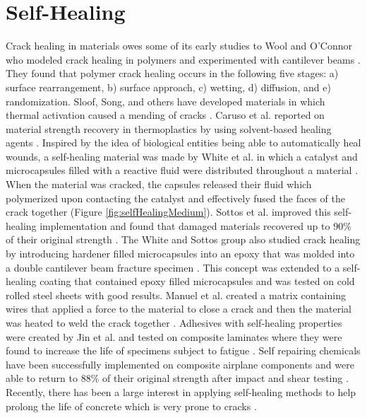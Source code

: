 \section{Self-Healing}

Crack healing in materials owes some of its early studies to Wool and O'Connor who modeled crack healing in polymers and experimented with cantilever beams \cite{Wool1981, Wool1982}. They found that polymer crack healing occurs in the following five stages: a) surface rearrangement, b) surface approach, c) wetting, d) diffusion, and e) randomization. Sloof, Song, and others have developed materials in which thermal activation caused a mending of cracks \cite{Song2009, Sloof2009, Bosman2009, Djugum2009, Luo2009}. Caruso et al. reported on material strength recovery in thermoplastics by using solvent-based healing agents \cite{Caruso2009}. Inspired by the idea of biological entities being able to automatically heal wounds, a self-healing material was made by White et al. in which a catalyst and microcapsules filled with a reactive fluid were distributed throughout a material \cite{White2001}. When the material was cracked, the capsules released their fluid which polymerized upon contacting the catalyst and effectively fused the faces of the crack together (Figure \ref{fig:selfHealingMedium}). Sottos et al. improved this self-healing implementation and found that damaged materials recovered up to 90\% of their original strength \cite{Sottos2009}. The White and Sottos group also studied crack healing by introducing hardener filled microcapsules into an epoxy that was molded into a double cantilever beam fracture specimen \cite{Mcllroy2009}. This concept was extended to a self-healing coating that contained epoxy filled microcapsules and was tested on cold rolled steel sheets with good results\cite{Zhao2012}. Manuel et al. created a matrix containing wires that applied a force to the material to close a crack and then the material was heated to weld the crack together \cite{Manuel2009}. Adhesives with self-healing properties were created by Jin et al. and tested on composite laminates where they were found to increase the life of specimens subject to fatigue \cite{Jin2009}. Self repairing chemicals have been successfully implemented on composite airplane components and were able to return to 88\% of their original strength after impact and shear testing \cite{Dry2009}. Recently, there has been a large interest in applying self-healing methods to help prolong the life of concrete which is very prone to cracks \cite{Wu2012}. 


